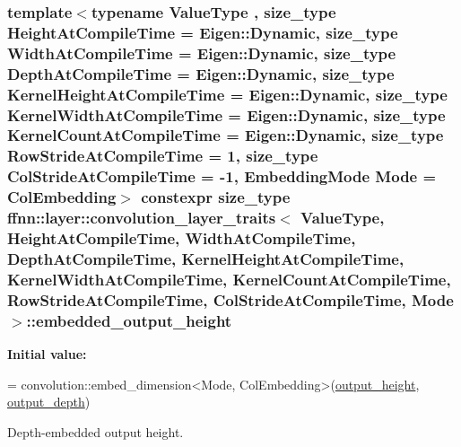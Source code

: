 \hypertarget{structffnn_1_1layer_1_1convolution__layer__traits_a00abec5f1e390a13ce4fc9daf67e5ca7}{
\subsubsection[{embedded\-\_\-output\-\_\-height}]{\setlength{\rightskip}{0pt plus 5cm}template$<$typename Value\-Type , size\-\_\-type Height\-At\-Compile\-Time = Eigen\-::\-Dynamic, size\-\_\-type Width\-At\-Compile\-Time = Eigen\-::\-Dynamic, size\-\_\-type Depth\-At\-Compile\-Time = Eigen\-::\-Dynamic, size\-\_\-type Kernel\-Height\-At\-Compile\-Time = Eigen\-::\-Dynamic, size\-\_\-type Kernel\-Width\-At\-Compile\-Time = Eigen\-::\-Dynamic, size\-\_\-type Kernel\-Count\-At\-Compile\-Time = Eigen\-::\-Dynamic, size\-\_\-type Row\-Stride\-At\-Compile\-Time = 1, size\-\_\-type Col\-Stride\-At\-Compile\-Time = -\/1, Embedding\-Mode Mode = Col\-Embedding$>$ constexpr {\bf size\-\_\-type} {\bf ffnn\-::layer\-::convolution\-\_\-layer\-\_\-traits}$<$ Value\-Type, Height\-At\-Compile\-Time, Width\-At\-Compile\-Time, Depth\-At\-Compile\-Time, Kernel\-Height\-At\-Compile\-Time, Kernel\-Width\-At\-Compile\-Time, Kernel\-Count\-At\-Compile\-Time, Row\-Stride\-At\-Compile\-Time, Col\-Stride\-At\-Compile\-Time, Mode $>$\-::embedded\-\_\-output\-\_\-height\hspace{0.3cm}{\ttfamily [static]}}}\label{structffnn_1_1layer_1_1convolution__layer__traits_a00abec5f1e390a13ce4fc9daf67e5ca7}
{\bfseries Initial value\-:}
\begin{DoxyCode}
=
    convolution::embed\_dimension<Mode, ColEmbedding>(\hyperlink{structffnn_1_1layer_1_1convolution__layer__traits_a352db60c55310a92c32b68ecec8967db}{output\_height}, 
      \hyperlink{structffnn_1_1layer_1_1convolution__layer__traits_ad2c2cfab03dd0a071bf0497ecf514086}{output\_depth})
\end{DoxyCode}


Depth-\/embedded output height. 

